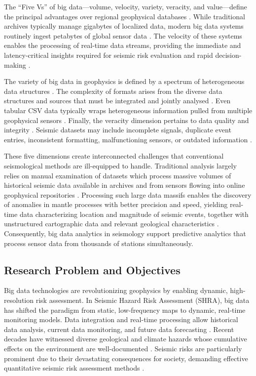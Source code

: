 \documentclass[data,article,accept,pdftex,moreauthors]{Definitions/mdpi}
\begin{document}
The ``Five Vs'' of big data---volume, velocity, variety, veracity, and value---define the principal advantages over regional geophysical databases \cite{Laney2001,Kitchin2014,Hashem2015}. While traditional archives typically manage gigabytes of localized data, modern big data systems routinely ingest petabytes of global sensor data \cite{arrowsmith2022big}. The velocity of these systems enables the processing of real-time data streams, providing the immediate and latency-critical insights required for seismic risk evaluation and rapid decision-making \cite{gandomi2015beyond,allen2009earthquake}.

The variety of big data in geophysics is defined by a spectrum of heterogeneous data structures \cite{MA201547}. The complexity of formats arises from the diverse data structures and sources that must be integrated and jointly analysed \cite{chen2014big}. Even tabular CSV data typically wraps heterogeneous information pulled from multiple geophysical sensors \cite{zhao2024artificial,Stocks2019}. Finally, the veracity dimension pertains to data quality and integrity \cite{vance2024big,Lietal2016}. Seismic datasets may include incomplete signals, duplicate event entries, inconsistent formatting, malfunctioning sensors, or outdated information \cite{mousavi2019cred}.

These five dimensions create interconnected challenges that conventional seismological methods are ill-equipped to handle. Traditional analysis largely relies on manual examination of datasets which process massive volumes of historical seismic data available in archives and from sensors flowing into online geophysical repositories \cite{Kong2019,Sopher,lemenkova2023computer}. Processing such large data massifs enables the discovery of anomalies in mantle processes with better precision and speed, yielding real-time data characterizing location and magnitude of seismic events, together with unstructured cartographic data and relevant geological characteristics \cite{baumann2016big,ZhuBeroza2019}. Consequently, big data analytics in seismology support predictive analytics that process sensor data from thousands of stations simultaneously.

\subsection{Research Problem and Objectives}

Big data technologies are revolutionizing geophysics by enabling dynamic, high-resolution risk assessment. In Seismic Hazard Risk Assessment (SHRA), big data has shifted the paradigm from static, low-frequency maps to dynamic, real-time monitoring models. Data integration and real-time processing allow historical data analysis, current data monitoring, and future data forecasting \cite{Sen2009}. Recent decades have witnessed diverse geological and climate hazards whose cumulative effects on the environment are well-documented \cite{Liggins2013}. Seismic risks are particularly prominent due to their devastating consequences for society, demanding effective quantitative seismic risk assessment \linebreak methods \cite{Dowrick2009,Liu2024}.
\end{document}
